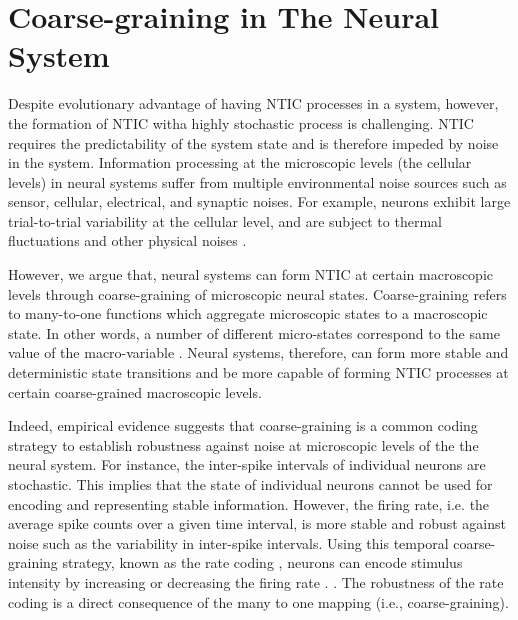 \documentclass[utf8]{article}
\begin{document}
            


	\section{Coarse-graining in The Neural System} \label{sec:Neural coarse-graining}

		Despite evolutionary advantage of having NTIC processes in a system, however, the formation of NTIC witha  highly stochastic process is challenging. NTIC requires the predictability of the system state and is therefore impeded by noise in the system. Information processing at the microscopic levels (the cellular levels) in neural systems suffer from multiple environmental noise sources such as sensor, cellular, electrical, and synaptic noises. For example, neurons exhibit large trial-to-trial variability at the cellular level, and are subject to thermal fluctuations and other physical noises \citep{faisal2008noise}. 
		
  
		However, we argue that, neural systems can form NTIC at certain macroscopic levels through coarse-graining of microscopic neural states. Coarse-graining refers to many-to-one functions which aggregate microscopic states to a macroscopic state. In other words, a number of different micro-states correspond to the same value of the macro-variable \citep{price2007causation}. Neural systems, therefore, can form more stable and deterministic state transitions and be more capable of forming NTIC processes at certain coarse-grained macroscopic levels. 
		
		Indeed, empirical evidence suggests that coarse-graining is a common coding strategy to establish robustness against noise at microscopic levels of the the neural system. For instance, the inter-spike intervals of individual neurons are stochastic. This implies that the state of individual neurons cannot be used for encoding and representing stable information. However, the firing rate, i.e. the average spike counts over a given time interval, is more stable and robust against noise such as the variability in inter-spike intervals. Using this temporal coarse-graining strategy, known as the rate coding \citep{adrian1926impulses, gerstner2002spiking, maass2001pulsed, panzeri2015neural, stein2005neuronal}, neurons can encode stimulus intensity by increasing or decreasing the firing rate \citep{kandel2000principles}. \citep{stein2005neuronal}. The robustness of the rate coding is a direct consequence of the many to one mapping (i.e., coarse-graining).
		
\end{document}
